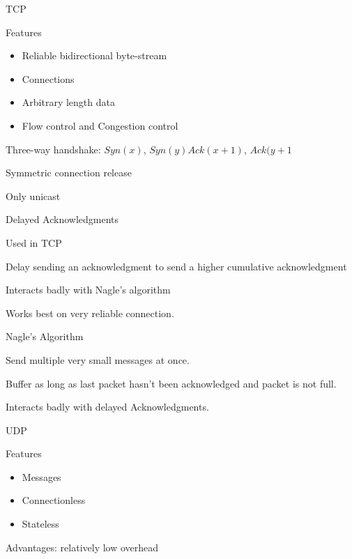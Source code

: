 \documentclass[main.tex]{subfiles}
\begin{document}
\small


\begin{card}{TCP}
\item Features
    \begin{itemize}
        \item Reliable bidirectional byte-stream
        \item Connections
        \item Arbitrary length data
        \item Flow control and Congestion control
    \end{itemize}
\item Three-way handshake: $Syn(x)$, $Syn(y)Ack(x+1)$, $Ack(y+1$
\item Symmetric connection release
\item Only unicast
\end{card}

\begin{card}{Delayed Acknowledgments}
\item Used in TCP
\item Delay sending an acknowledgment to send a higher cumulative acknowledgment
\item Interacts badly with Nagle's algorithm
\item Works best on very reliable connection.
\end{card}

\begin{card}{Nagle's Algorithm}
\item Send multiple very small messages at once.
\item Buffer as long as last packet hasn't been acknowledged and packet is not full.
\item Interacts badly with delayed Acknowledgments.
\end{card}

\begin{card}{UDP}
\item Features
    \begin{itemize}
        \item Messages
        \item Connectionless
        \item Stateless
    \end{itemize}
\item Advantages: relatively low overhead
\end{card}
\end{document}
